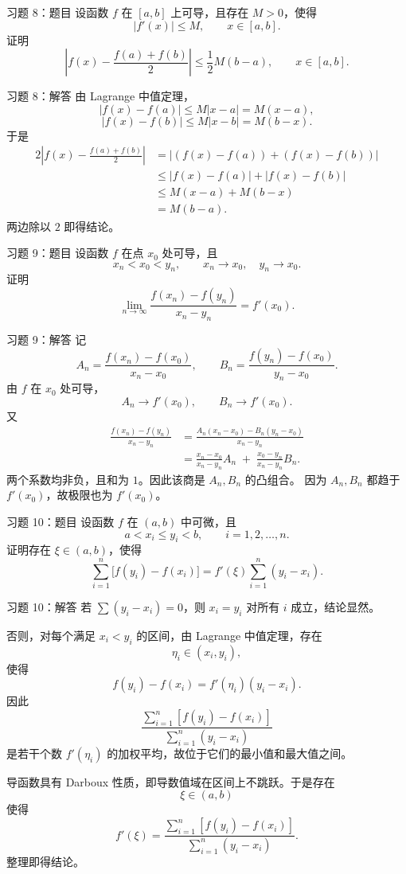 \documentclass[aspectratio=169,10pt]{ctexbeamer}
\begin{document}
\begin{frame}[t]{习题 8：题目}
\small
设函数 $f$ 在 $[a,b]$ 上可导，且存在 $M>0$，使得
\[
  |f'(x)|\le M,\qquad x\in[a,b].
\]
证明
\[
  \left|f(x)-\frac{f(a)+f(b)}2\right|
  \le \frac12 M(b-a),
  \qquad x\in[a,b].
\]
\end{frame}

\begin{frame}[t]{习题 8：解答}
\small
由 Lagrange 中值定理，
\[
  |f(x)-f(a)|\le M|x-a|=M(x-a),
\]
\[
  |f(x)-f(b)|\le M|x-b|=M(b-x).
\]
于是
\[
\begin{aligned}
2\left|f(x)-\frac{f(a)+f(b)}2\right|
&=\left|(f(x)-f(a))+(f(x)-f(b))\right|\\
&\le |f(x)-f(a)|+|f(x)-f(b)|\\
&\le M(x-a)+M(b-x)\\
&=M(b-a).
\end{aligned}
\]
两边除以 $2$ 即得结论。
\end{frame}

\begin{frame}[t]{习题 9：题目}
\small
设函数 $f$ 在点 $x_0$ 处可导，且
\[
  x_n<x_0<y_n,\qquad x_n\to x_0,\quad y_n\to x_0.
\]
证明
\[
  \lim_{n\to\infty}
  \frac{f(x_n)-f(y_n)}{x_n-y_n}
  =f'(x_0).
\]
\end{frame}

\begin{frame}[t]{习题 9：解答}
\footnotesize
记
\[
  A_n=\frac{f(x_n)-f(x_0)}{x_n-x_0},\qquad
  B_n=\frac{f(y_n)-f(x_0)}{y_n-x_0}.
\]
由 $f$ 在 $x_0$ 处可导，
\[
  A_n\to f'(x_0),\qquad B_n\to f'(x_0).
\]
又
\[
\begin{aligned}
\frac{f(x_n)-f(y_n)}{x_n-y_n}
&=
\frac{A_n(x_n-x_0)-B_n(y_n-x_0)}{x_n-y_n}\\
&=
\frac{x_n-x_0}{x_n-y_n}A_n
\;+\;
\frac{x_0-y_n}{x_n-y_n}B_n.
\end{aligned}
\]
两个系数均非负，且和为 $1$。因此该商是 $A_n,B_n$ 的凸组合。
因为 $A_n,B_n$ 都趋于 $f'(x_0)$，故极限也为 $f'(x_0)$。
\end{frame}

\begin{frame}[t]{习题 10：题目}
\small
设函数 $f$ 在 $(a,b)$ 中可微，且
\[
  a<x_i\le y_i<b,\qquad i=1,2,\ldots,n.
\]
证明存在 $\xi\in(a,b)$，使得
\[
  \sum_{i=1}^n\bigl[f(y_i)-f(x_i)\bigr]
  =
  f'(\xi)\sum_{i=1}^n(y_i-x_i).
\]
\end{frame}

\begin{frame}[t]{习题 10：解答}
\footnotesize
若 $\sum (y_i-x_i)=0$，则 $x_i=y_i$ 对所有 $i$ 成立，结论显然。

否则，对每个满足 $x_i<y_i$ 的区间，由 Lagrange 中值定理，存在
\[
  \eta_i\in(x_i,y_i),
\]
使得
\[
  f(y_i)-f(x_i)=f'(\eta_i)(y_i-x_i).
\]
因此
\[
  \frac{\sum_{i=1}^n[f(y_i)-f(x_i)]}{\sum_{i=1}^n(y_i-x_i)}
\]
是若干个数 $f'(\eta_i)$ 的加权平均，故位于它们的最小值和最大值之间。

导函数具有 Darboux 性质，即导数值域在区间上不跳跃。于是存在
\[
  \xi\in(a,b)
\]
使得
\[
  f'(\xi)=
  \frac{\sum_{i=1}^n[f(y_i)-f(x_i)]}{\sum_{i=1}^n(y_i-x_i)}.
\]
整理即得结论。
\end{frame}
\end{document}

